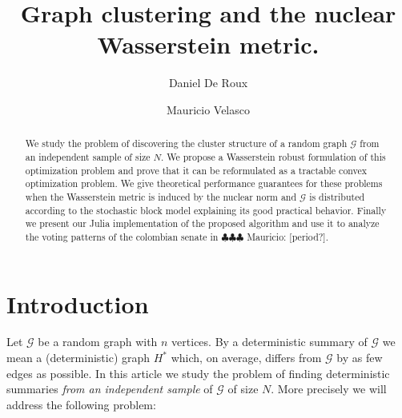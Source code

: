 \documentclass[12pt]{amsart}
\theoremstyle{remark}
\newcommand{\grG}{{\mathcal{G}}}
\newcommand{\mv}[1]{{\color{red} \sf $\clubsuit\clubsuit\clubsuit$ Mauricio: [#1]}}
\begin{document}
\author{Daniel De Roux}
\address{
Departamento de matem\'aticas\\
Universidad de los Andes\\
Carrera $1^{\rm ra}\#18A-12$\\ 
Bogot\'a, Colombia
}

\author{Mauricio Velasco}
\address{
Departamento de matem\'aticas\\
Universidad de los Andes\\
Carrera $1^{\rm ra}\#18A-12$\\ 
Bogot\'a, Colombia
}


\begin{abstract} We study the problem of discovering the cluster structure of a random graph $\grG$ from an independent sample of size $N$. We propose a Wasserstein robust formulation of this optimization problem and prove that it can be reformulated as a tractable convex optimization problem. We give theoretical performance guarantees for these problems when the Wasserstein metric is induced by the nuclear norm and $\grG$ is distributed according to the stochastic block model explaining its good practical behavior. Finally we present our Julia implementation of the proposed algorithm and use it to analyze the voting patterns of the colombian senate in \mv{period?}.
\end{abstract} 

\title{Graph clustering and the nuclear Wasserstein metric.}
\maketitle

\section{Introduction}



Let $\grG$ be a random graph with $n$ vertices. By a deterministic summary of $\grG$ we mean a (deterministic) graph $H^*$ which, on average, differs from $\grG$ by as few edges as possible. In this article we study the problem of finding deterministic summaries {\it from an independent sample} of $\grG$ of size $N$. More precisely we will address the following problem:
\end{document}
